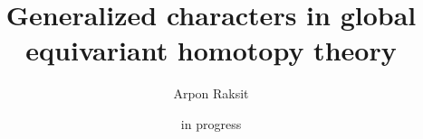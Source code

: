 

\title{Generalized characters in global equivariant homotopy theory}
\author{Arpon Raksit}
\date{in progress}


\maketitle

\newcommand{\pt}{\mathrm{pt}}
\renewcommand{\Top}{\mathrm{Top}}
\newcommand{\CW}{\mathrm{CW}}
\newcommand{\Space}{\mathrm{Space}}
\newcommand{\Sp}{\mathrm{Sp}}
\newcommand{\Grp}{\mathrm{Grp}}
\newcommand{\Glo}{\mathrm{Glo}}
\newcommand{\Alo}{\mathrm{Alo}}
\newcommand{\Bor}{\mathrm{Bor}}









